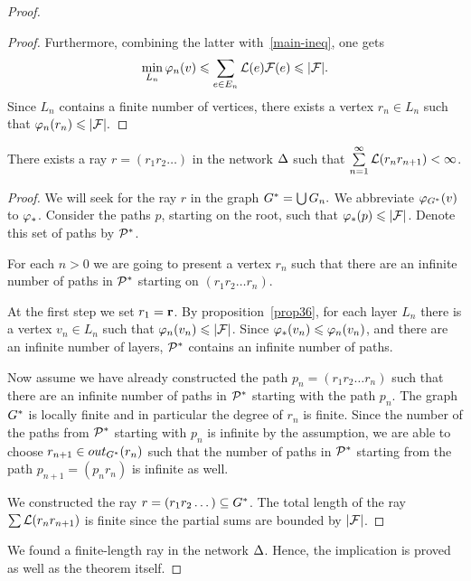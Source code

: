 \documentclass[12pt,oneside,a4paper]{amsart}
\begin{document}
\begin{proof}
\begin{proof}
            Furthermore, combining the latter with~\eqref{main-ineq}, one gets
              \[
              \min_{L_n} \phi_n(v) \leq \sum_{e \in E_n} \len(e) \flowpos(e) \leq \lvert\flowpos\rvert.
              \]
            Since $L_n$ contains a finite number of vertices, there exists a vertex $r_n \in L_n$ such that
              $\phi_n(r_n) \leq \lvert\flowpos\rvert.$
          \end{proof}
          \begin{prop}
            There exists a ray $r=(r_1 r_2\dots)$ in the network $\net$ such that $\sum\limits_{n=1}^\infty \len(r_n r_{n+1}) < \infty$.
          \end{prop}
          \begin{proof}
            We will seek for the ray $r$ in the graph $\gstar = \bigcup G_n.$
            We abbreviate $\phi_{\gstar}(v)$ to $\phistar$.
            Consider the paths $p$, starting on the root, such that $\phistar(p) \leq \lvert\flowpos\rvert$.
            Denote this set of paths by $\cal{P}^*$.

            For each $n > 0$ we are going to present a vertex $r_n$ such that there are an infinite number of paths
              in $\cal{P}^*$ starting on $(r_1 r_2 \dots r_n)$.

            At the first step we set $r_1 = \root$.
            By proposition~\ref{prop36}, for each layer $L_n$ there is a vertex $v_n \in L_n$ such that
              $\phi_n(v_n) \leq \lvert\flowpos\rvert$.
            Since $\phistar(v_n) \leq \phi_n(v_n)$, and there are an infinite number of layers,
              $\cal{P}^*$ contains an infinite number of paths.

            Now assume we have already constructed the path $p_n = (r_1 r_2\dots r_n)$ such that
              there are an infinite number of paths in $\cal{P}^*$ starting with the path $p_n$.
            The graph $\gstar$ is locally finite and in particular the degree of $r_n$ is finite.
            Since the number of the paths from $\cal{P}^*$ starting with $p_n$ is infinite by the assumption,
              we are able to choose $r_{n+1} \in \eout_{G^*}(r_n)$ such that the number of paths in $\cal{P}^*$ starting from
              the path $p_{n+1}= (p_n r_n)$ is infinite as well.

            We constructed the ray $r = (r_1 r_2 \dots) \subseteq \gstar$.
            The total length of the ray $\sum \len(r_n r_{n+1})$ is finite
              since the partial sums are bounded by $\lvert \flowpos \rvert$.
          \end{proof}
          We found a finite-length ray in the network $\net$.
          Hence, the implication is proved as well as the theorem itself.
      \end{proof}
\end{document}
